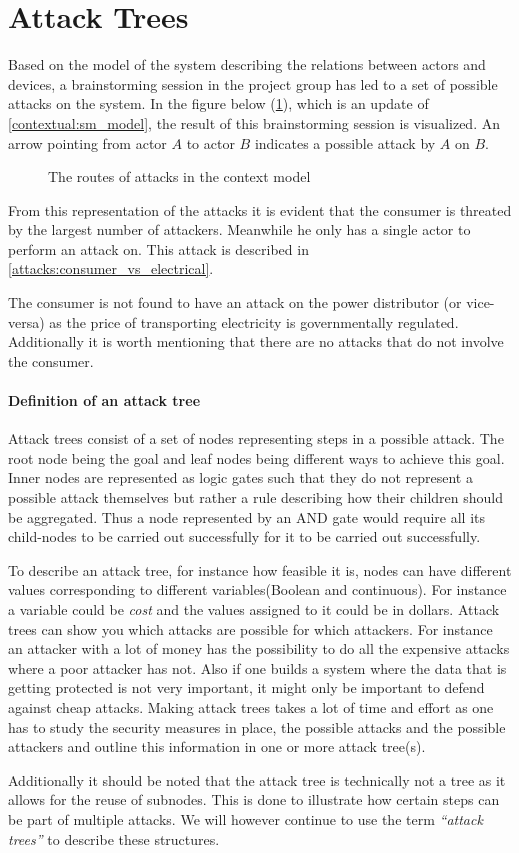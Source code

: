 \section{Attack Trees}
Based on the model of the system describing the relations between actors and devices, a brainstorming session in the project group has led to a set of possible attacks on the system.
In the figure below (\cref{contextual:sm_model_attack}), which is an update of \cref{contextual:sm_model}, the result of this brainstorming session is visualized.
An arrow pointing from actor $A$ to actor $B$ indicates a possible attack by $A$ on $B$.

\begin{figure}[H]
  \centering
  
  \caption{The routes of attacks in the context model}
  \label{contextual:sm_model_attack}
\end{figure}

From this representation of the attacks it is evident that the consumer is threated by the largest number of attackers.
Meanwhile he only has a single actor to perform an attack on.
This attack is described in \cref{attacks:consumer_vs_electrical}.

The consumer is not found to have an attack on the power distributor (or vice-versa) as the price of transporting electricity is governmentally regulated.
Additionally it is worth mentioning that there are no attacks that do not involve the consumer.

\paragraph{Definition of an attack tree}
Attack trees consist of a set of nodes representing steps in a possible attack.
The root node being the goal and leaf nodes being different ways to achieve this goal.
Inner nodes are represented as logic gates such that they do not represent a possible attack themselves but rather a rule describing how their children should be aggregated.
Thus a node represented by an AND gate would require all its child-nodes to be carried out successfully for it to be carried out successfully.

To describe an attack tree, for instance how feasible it is, nodes can have different values corresponding to different variables(Boolean and continuous).
For instance a variable could be \textit{cost} and the values assigned to it could be in dollars.
Attack trees can show you which attacks are possible for which attackers.
For instance an attacker with a lot of money has the possibility to do all the expensive attacks where a poor attacker has not.
Also if one builds a system where the data that is getting protected is not very important, it might only be important to defend against cheap attacks.
Making attack trees takes a lot of time and effort as one has to study the security measures in place, the possible attacks and the possible attackers and outline this information in one or more attack tree(s).\cite{schneier_attack_trees}

Additionally it should be noted that the attack tree is technically not a tree as it allows for the reuse of subnodes.
This is done to illustrate how certain steps can be part of multiple attacks.
We will however continue to use the term \emph{``attack trees''} to describe these structures.
